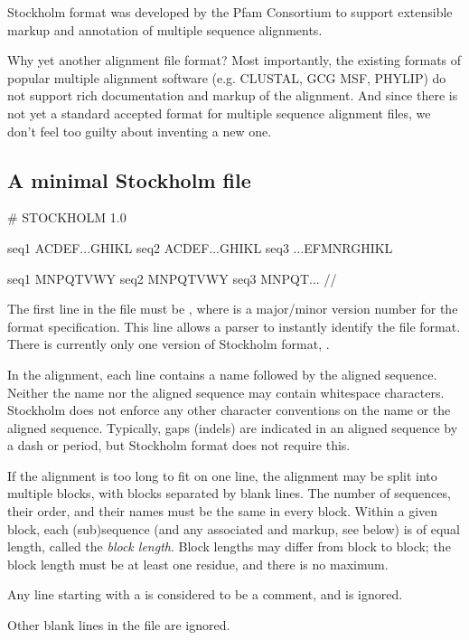 
Stockholm format was developed by the Pfam Consortium to support
extensible markup and annotation of multiple sequence alignments.

Why yet another alignment file format?  Most importantly, the existing
formats of popular multiple alignment software (e.g. CLUSTAL, GCG MSF,
PHYLIP) do not support rich documentation and markup of the
alignment. And since there is not yet a standard accepted format for
multiple sequence alignment files, we don't feel too guilty about
inventing a new one.

\subsection{A minimal Stockholm file}
\begin{cchunk}
# STOCKHOLM 1.0

seq1  ACDEF...GHIKL
seq2  ACDEF...GHIKL
seq3  ...EFMNRGHIKL

seq1  MNPQTVWY
seq2  MNPQTVWY
seq3  MNPQT...
//
\end{cchunk}

The first line in the file must be , where
 is a major/minor version number for the format
specification. This line allows a parser to instantly identify the
file format. There is currently only one version of Stockholm format,
.

In the alignment, each line contains a name followed by the aligned
sequence. Neither the name nor the aligned sequence may contain
whitespace characters. Stockholm does not enforce any other character
conventions on the name or the aligned sequence. Typically, gaps
(indels) are indicated in an aligned sequence by a dash or period, but
Stockholm format does not require this.

If the alignment is too long to fit on one line, the alignment may be
split into multiple blocks, with blocks separated by blank lines. The
number of sequences, their order, and their names must be the same in
every block. Within a given block, each (sub)sequence (and any
associated  and  markup, see below) is of
equal length, called the \emph{block length}. Block lengths may differ
from block to block; the block length must be at least one residue,
and there is no maximum.

Any line starting with a \ccode{\#} is considered to be a comment, and
is ignored.

Other blank lines in the file are ignored. 

